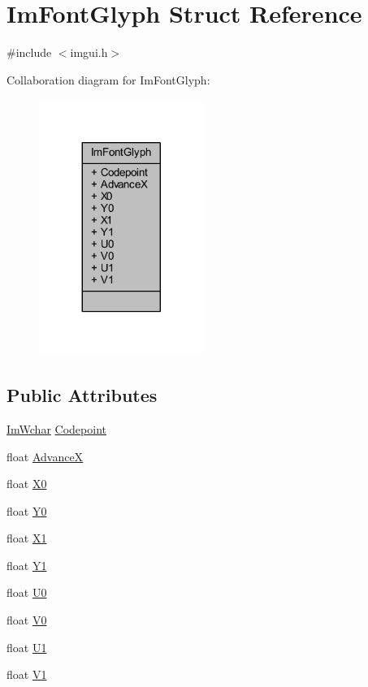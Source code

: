 \hypertarget{struct_im_font_glyph}{}\section{Im\+Font\+Glyph Struct Reference}
\label{struct_im_font_glyph}


{\ttfamily \#include $<$imgui.\+h$>$}



Collaboration diagram for Im\+Font\+Glyph\+:
\nopagebreak
\begin{figure}[H]
\begin{center}
\leavevmode
\includegraphics[width=152pt]{struct_im_font_glyph__coll__graph}
\end{center}
\end{figure}
\subsection*{Public Attributes}
\begin{DoxyCompactItemize}
\item 
\mbox{\hyperlink{imgui_8h_af2c7badaf05a0008e15ef76d40875e97}{Im\+Wchar}} \mbox{\hyperlink{struct_im_font_glyph_a3ff56d019068137a3df514caa3961421}{Codepoint}}
\item 
float \mbox{\hyperlink{struct_im_font_glyph_a11bfab7bcdb497fe2d649745c7d39b33}{AdvanceX}}
\item 
float \mbox{\hyperlink{struct_im_font_glyph_a1e93bf7292c052549972fc46646ff104}{X0}}
\item 
float \mbox{\hyperlink{struct_im_font_glyph_ac1deecd5b352949f30d396a58b68dd09}{Y0}}
\item 
float \mbox{\hyperlink{struct_im_font_glyph_a1d907170d807c5e5f2a43d74b99f0d89}{X1}}
\item 
float \mbox{\hyperlink{struct_im_font_glyph_aa6a0440694ae06c4cf03316498327bd2}{Y1}}
\item 
float \mbox{\hyperlink{struct_im_font_glyph_a3c9d90fb39f6beaf9d69413fa4c8366f}{U0}}
\item 
float \mbox{\hyperlink{struct_im_font_glyph_a26b7b7b9ee43ab67e98af9ea1131ce20}{V0}}
\item 
float \mbox{\hyperlink{struct_im_font_glyph_aaca9625f2d6972016e05fed583db85b0}{U1}}
\item 
float \mbox{\hyperlink{struct_im_font_glyph_a3d28904aad639835cdff3e4416663d7c}{V1}}
\end{DoxyCompactItemize}


